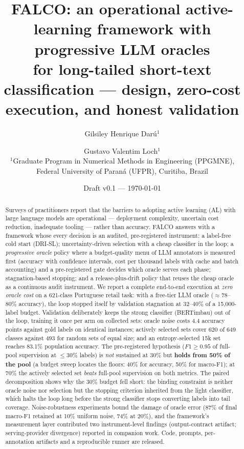 \documentclass[11pt]{article}
\title{FALCO: an operational active-learning framework with progressive
LLM oracles\\ for long-tailed short-text classification --- design,
zero-cost execution, and honest validation}
\author{Gilsiley Henrique Darú$^{1}$ \and Gustavo Valentim Loch$^{1}$\\[2pt]
\normalsize $^{1}$Graduate Program in Numerical Methods in Engineering (PPGMNE),\\
\normalsize Federal University of Paraná (UFPR), Curitiba, Brazil}
\date{Draft v0.1 --- \today}
\begin{document}
\maketitle

\begin{abstract}
Surveys of practitioners report that the barriers to adopting active
learning (AL) with large language models are operational --- deployment
complexity, uncertain cost reduction, inadequate tooling --- rather than
accuracy. FALCO answers with a framework whose every decision is an
audited, pre-registered instrument: a label-free cold start (DRI-SL);
uncertainty-driven selection with a cheap classifier in the loop;
a \emph{progressive oracle} policy where a budget-quality menu of LLM
annotators is measured first (accuracy with confidence intervals, cost
per thousand labels with cache and batch accounting) and a pre-registered
gate decides which oracle serves each phase; stagnation-based stopping;
and a release-plus-drift policy that reuses the cheap oracle as a
continuous audit instrument. We report a complete end-to-end execution at
\emph{zero oracle cost} on a 621-class Portuguese retail task: with a
free-tier LLM oracle ($\approx$78--80\% accuracy), the loop stopped
itself by validation stagnation at 32--40\% of a 15{,}000-label budget.
Validation deliberately keeps the strong classifier (BERTimbau) out of
the loop, training it once per arm on collected sets: oracle noise costs
4.4 accuracy points against gold labels on identical instances; actively
selected sets cover 620 of 649 classes against 493 for random sets of
equal size; and an entropy-selected 15k set reaches 83.1\% population
accuracy. The pre-registered hypothesis ($F1 \ge 0.95$ of full-pool
supervision at $\le 30\%$ labels) is \emph{not} sustained at 30\% but
\textbf{holds from 50\% of the pool} (a budget sweep locates the floors:
40\% for accuracy, 50\% for macro-F1); at 70\% the actively selected set
\emph{beats} full-pool supervision on both metrics. The paired
decomposition shows why the 30\% budget fell short: the binding constraint
is neither oracle noise nor selection but the stopping criterion inherited
from the light classifier, which halts the loop long before the strong
classifier stops converting labels into tail coverage.
Noise-robustness experiments bound the damage of oracle error (87\% of
final macro-F1 retained at 10\% uniform noise, 74\% at 20\%), and the
framework's measurement layer contributed two instrument-level findings
(output-contract artifact; serving-provider divergence) reported in
companion work. Code, prompts, per-annotation artifacts and a
reproducible runner are released.
\end{abstract}
\end{document}
